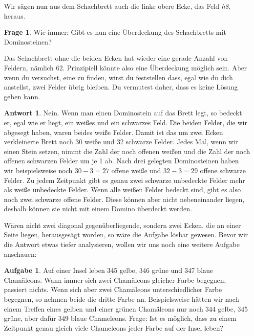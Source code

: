 \documentclass[a4paper,ngerman,12pt]{scrartcl}
\theoremstyle{definition}
\newtheorem*{aufg}{Aufgabe}
\newtheorem*{frage}{Frage}
\newtheorem*{antw}{Antwort}
\begin{document}
Wir sägen nun aus dem Schachbrett auch die linke obere Ecke, das Feld \emph{h8}, heraus.

\begin{frage}
  Wie immer: Gibt es nun eine Überdeckung des Schachbretts mit Dominosteinen?
\end{frage}

Das Schachbrett ohne die beiden Ecken hat wieder eine gerade Anzahl von Feldern, nämlich 62. Prinzipiell könnte also eine Überdeckung möglich sein. Aber wenn du versuchst, eine zu finden, wirst du feststellen dass, egal wie du dich anstellst, zwei Felder übrig bleiben. Du vermutest daher, dass es keine Lösung geben kann.

\begin{antw}
  Nein. Wenn man einen Dominostein auf das Brett legt, so bedeckt er, egal wie er liegt, ein weißes und ein schwarzes Feld. Die beiden Felder, die wir abgesegt haben, waren beides weiße Felder. Damit ist das um zwei Ecken verkleinerte Brett noch 30 weiße und 32 schwarze Felder. Jedes Mal, wenn wir einen Stein setzen, nimmt die Zahl der noch offenen weißen und die Zahl der noch offenen schwarzen Felder um je 1 ab. Nach drei gelegten Dominosteinen haben wir beispielsweise noch $30-3=27$ offene weiße und $32-3=29$ offene schwarze Felder. Zu jedem Zeitpunkt gibt es genau zwei schwarze unbedeckte Felder mehr als weiße unbedeckte Felder. Wenn alle weißen Felder bedeckt sind, gibt es also noch zwei schwarze offene Felder. Diese können aber nicht nebeneinander liegen, deshalb können sie nicht mit einem Domino überdeckt werden.
\end{antw}

Wären nicht zwei diagonal gegenüberliegende, sondern zwei Ecken, die an einer Seite liegen, herausgesägt worden, so wäre die Aufgabe lösbar gewesen. Bevor wir die Antwort etwas tiefer analysieren, wollen wir uns noch eine weitere Aufgabe anschauen:

\begin{aufg}
  Auf einer Insel leben 345 gelbe, 346 grüne und 347 blaue Chamäleons. Wann immer sich zwei Chamäleons gleicher Farbe begegnen, passiert nichts. Wenn sich aber zwei Chamäleons unterschiedlicher Farbe begegnen, so nehmen beide die dritte Farbe an. Beispielsweise hätten wir nach einem Treffen eines gelben und einer grünen Chamäleons nur noch 344 gelbe, 345 grüne, aber dafür 349 blaue Chameleons. Frage: Ist es möglich, dass zu einem Zeitpunkt genau gleich viele Chameleons jeder Farbe auf der Insel leben?
\end{aufg}
\end{document}
